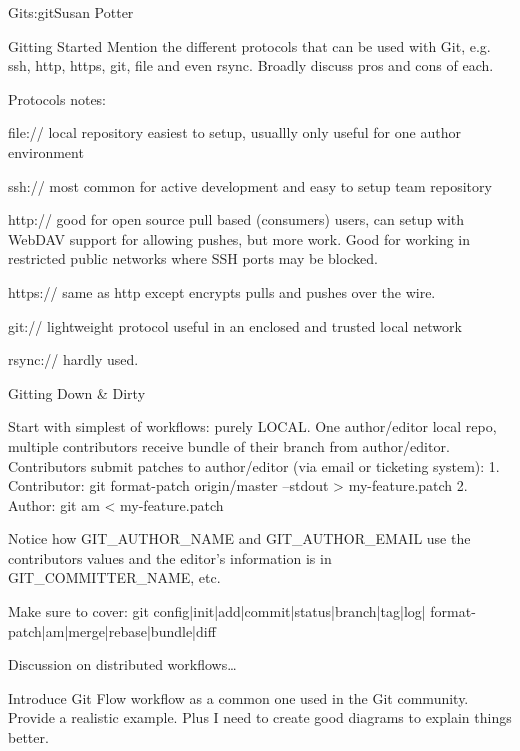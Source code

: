 \begin{aosachapter}{Git}{s:git}{Susan Potter}
\begin{aosasect1}{Gitting Started}
Mention the different protocols that can be used with Git, e.g. ssh, http,
https, git, file and even rsync. Broadly discuss pros and cons of each.

Protocols notes:
\begin{aosaitemize}
  \item file:// local repository easiest to setup, usuallly only useful for
    one author environment
  \item ssh:// most common for active development and easy to setup team
  repository
  \item http:// good for open source pull based (consumers) users, can setup
  with WebDAV support for allowing pushes, but more work. Good for working in
  restricted public networks where SSH ports may be blocked.
  \item https:// same as http except encrypts pulls and pushes over the wire.
  \item git:// lightweight protocol useful in an enclosed and trusted local
  network
  \item rsync:// hardly used.
\end{aosaitemize}

\end{aosasect1}

\begin{aosasect1}{Gitting Down \& Dirty}

Start with simplest of workflows: purely LOCAL. One author/editor local repo,
multiple contributors receive bundle of their branch from author/editor.
Contributors submit patches to author/editor (via email or ticketing system):
1. Contributor: git format-patch origin/master --stdout > my-feature.patch
2. Author: git am < my-feature.patch

Notice how GIT\_AUTHOR\_NAME and GIT\_AUTHOR\_EMAIL use the contributors
values and the editor's information is in GIT\_COMMITTER\_NAME, etc.

Make sure to cover: git config|init|add|commit|status|branch|tag|log|
format-patch|am|merge|rebase|bundle|diff


Discussion on distributed workflows\ldots

Introduce Git Flow workflow as a common one used in the Git community. Provide
a realistic example. Plus I need to create good diagrams to explain things
better.


\end{aosasect1}
\end{aosachapter}
